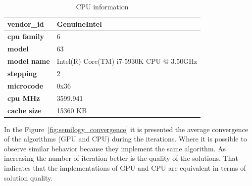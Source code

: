 \documentclass[conference]{IEEEtran}
\begin{document}
    \begin{table}[!htb]
        \centering
        \caption{CPU information}
        \label{tbl:cpuinfo}
        \begin{tabular}{|l|l|}
            \hline
            \textbf{vendor\_id} & GenuineIntel                             \\ \hline
            \textbf{cpu family} & 6                                        \\ \hline
            \textbf{model}      & 63                                       \\ \hline
            \textbf{model name} & Intel(R) Core(TM) i7-5930K CPU @ 3.50GHz \\ \hline
            \textbf{stepping}   & 2                                        \\ \hline
            \textbf{microcode}  & 0x36                                     \\ \hline
            \textbf{cpu MHz}    & 3599.941                                 \\ \hline
            \textbf{cache size} & 15360 KB                                 \\ \hline
        \end{tabular}
    \end{table}

    In the Figure~\ref{fig:semilogy_convergence} it is presented the average convergence of the algorithms (GPU and CPU) during the iterations. Where it is possible to observe similar behavior because they implement the same algorithm.
    As increasing the number of iteration better is the quality of the solutions. 
    That indicates that the implementations of GPU and CPU are equivalent in terms of solution quality.

\end{document}
